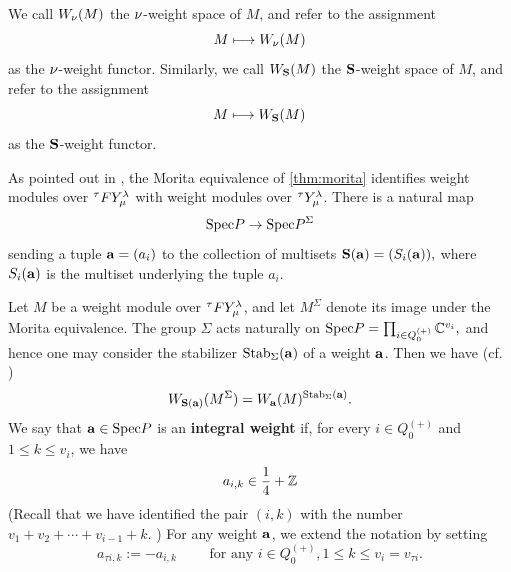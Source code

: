 We call $W_{\mathbf{\nu}}(M)$ the $\mathbf{\nu}$-weight space of $M$, and refer to the
assignment
\[
M\longmapsto W_{\mathbf{\nu}}(M)
\]
as the $\mathbf{\nu}$-weight functor. Similarly, we call $W_{\mathbf{S}}(M)$ the
$\mathbf{S}$-weight space of $M$, and refer to the assignment
\[
M\longmapsto W_{\mathbf{S}}(M)
\]
as the $\mathbf{S}$-weight functor.




As pointed out in \cite[Sect. 5.1]{KTWWY19}, the Morita equivalence of \cref{thm:morita} identifies weight modules over ${}^\tau F Y_\mu^\lambda$ with weight modules over ${}^\tau Y_\mu^\lambda$.  
There is a natural map
\[
\text{Spec} P \to \text{Spec} P^\Sigma
\]
sending a tuple $\mathbf{a}=(a_i)$ to the collection of multisets
\(
\mathbf{S}(\mathbf{a})=(S_i(\mathbf{a})),
\)
where $S_i(\mathbf{a})$ is the multiset underlying the tuple $a_i$.



Let $M$ be a weight module over ${}^\tau F Y_\mu^\lambda$, and let $M^\Sigma$ denote its image under the Morita equivalence.  
The group $\Sigma$ acts naturally on 
\(
\text{Spec} P=\prod_{i\in Q_0^{(+)}} \mathbb{C}^{v_i},
\)
and hence one may consider the stabilizer $\text{Stab}_\Sigma(\mathbf{a})$ of a weight $\mathbf{a}$.  
Then we have (cf. \cite[(5.1)]{KTWWY19})
\begin{equation}
\label{eq:weights-Y}
W_{\mathbf{S}(\mathbf{a})}(M^\Sigma)=W_{\mathbf{a}}(M)^{\text{Stab}_\Sigma(\mathbf{a})}.
\end{equation}
We say that $\mathbf{a} \in \text{Spec} P$ is an \textbf{integral weight} if, for every $i \in Q_0^{(+)}$ and $1 \le k \le v_i$, we have 
\begin{gather}
\label{integral}
a_{i,k}\in \frac{1}{4}+\mathbb{Z}
\end{gather}
(Recall that we have identified the pair $(i,k)$ with the number \(
 v_1+v_2+\cdots +v_{i-1}+k.
\) )
For any weight $\mathbf{a}$, we extend the notation by setting
\[
a_{\tau i,k}:=-a_{i,k}\qquad \text{ for any }i\in Q_0^{(+)},1\leq k \leq v_i=v_{\tau i}.
\]


